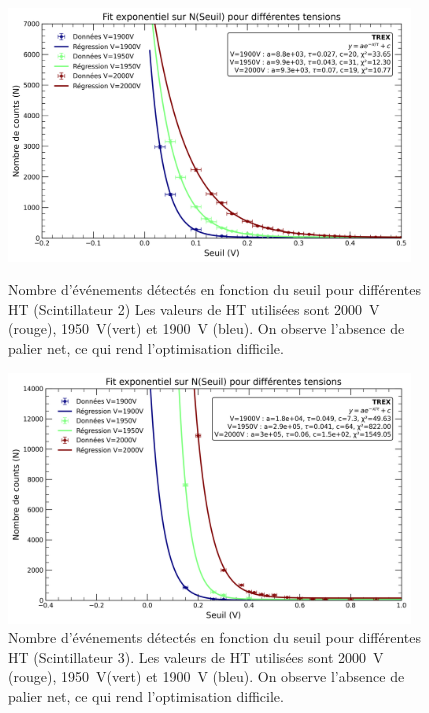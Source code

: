 \documentclass[a4paper,12pt,twoside]{article}
\begin{document}
\begin{figure}[H]
  \begin{minipage}{0.49\textwidth}
    \centering
    \includegraphics[width=0.95\textwidth]{Images/Threshold_Scintillateur_2.png}
    \caption{Nombre d’événements détectés en fonction du seuil pour différentes HT (Scintillateur 2)
    Les valeurs de HT utilisées sont 2000~V (rouge), 1950~V(vert) et 1900~V (bleu).
    On observe l'absence de palier net, ce qui rend l'optimisation difficile.}
    \label{fig:optimisation_scint2}
  \end{minipage}
  \hfill
  \begin{minipage}{0.49\textwidth}
    \centering
    \includegraphics[width=0.95\textwidth]{Images/Threshold_Scintillateur_3.png}
    \caption{Nombre d’événements détectés en fonction du seuil pour différentes HT (Scintillateur 3).
    Les valeurs de HT utilisées sont 2000~V (rouge), 1950~V(vert) et 1900~V (bleu).
    On observe l'absence de palier net, ce qui rend l'optimisation difficile.}
    \label{fig:optimisation_scint3}

  \end{minipage}
\end{figure}
\end{document}
